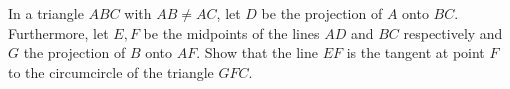 In a triangle $ABC$ with $AB\neq AC$, let $D$ be the projection of $A$ onto $BC$.
Furthermore, let $E,F$ be the midpoints of the lines $AD$ and $BC$ respectively and $G$ the
projection of $B$ onto $AF$.
Show that the line $EF$ is the tangent at point $F$ to the circumcircle of the triangle $GFC$.
